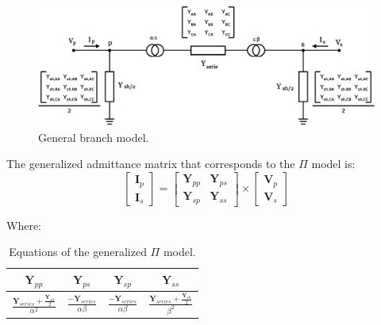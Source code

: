 \documentclass[a4paper,twoside,fleqn]{tufte-book}
\begin{document}
\begin{center}
	\begin{figure}[h]
		\includegraphics[width=0.6\linewidth]{img/Branch.eps}
		\caption{General branch model.}
		\label{pi_model}
	\end{figure}
\end{center}

The generalized admittance matrix that corresponds to the $\Pi$ model is:
\begin{equation}
\left[\begin{array}{c}
\textbf{I}_p \\
\textbf{I}_s
\end{array}\right] = \left[\begin{array}{cc}
\textbf{Y}_{pp} & \textbf{Y}_{ps} \\
\textbf{Y}_{sp} & \textbf{Y}_{ss}
\end{array}\right] \times \left[\begin{array}{c}
\textbf{V}_p \\
\textbf{V}_s
\end{array}\right]
\label{pi_main_formula}
\end{equation}

Where:

\begin{table}[h!]
\begin{center}
\begin{tabular}{cccc}
\toprule

$\textbf{Y}_{pp}$ &  $\textbf{Y}_{ps}$ & $\textbf{Y}_{sp}$ & $\textbf{Y}_{ss}$\\

\midrule

$\frac{\textbf{Y}_{series} + \frac{\textbf{Y}_{sh}}{2}}{\alpha^2}$ &  $\frac{-\textbf{Y}_{series}}{\alpha\beta}$ & $\frac{-\textbf{Y}_{series}}{\alpha\beta}$ & $\frac{\textbf{Y}_{series} + \frac{\textbf{Y}_{sh}}{2}}{\beta^2}$\\

\bottomrule
\end{tabular}
\end{center}
  \caption{Equations of the generalized $\Pi$ model.}
  \label{pi_model_equations}
\end{table}
\end{document}
